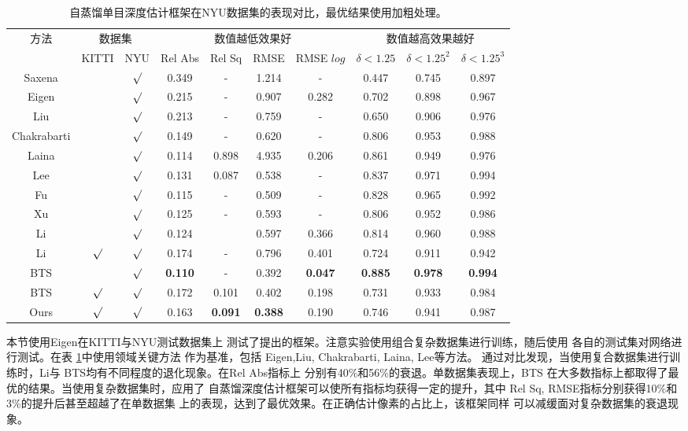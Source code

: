 \begin{table}[htb]
  \centering
  \caption{自蒸馏单目深度估计框架在NYU数据集的表现对比，最优结果使用加粗处理。}
  \label{tab:nyu quantitative result}
  \begin{tabular}{c|cc|cccc|ccc}
    \toprule
    \multirow{2}{*}{方法} & \multicolumn{2}{c|}{数据集}& \multicolumn{4}{c}{数值越低效果好}&\multicolumn{3}{|c}{数值越高效果越好}\\
    &KITTI&NYU& Rel Abs & Rel Sq & RMSE& RMSE $log$ &$\delta<1.25$ &$\delta<1.25^2$ & $\delta<1.25^3$ \\   
    \midrule
    Saxena\cite{Make3D}&&$\surd $&0.349&-&
    1.214&-&0.447&0.745&0.897\\
    Eigen\cite{eigen2014depth}&&$\surd$&0.215&-
    &0.907&0.282&0.702&0.898&0.967\\
    Liu\cite{liu2015learning}&&$\surd$&0.213&-&0.759&-&0.650&0.906&0.976\\
    Chakrabarti\cite{chakrabarti2016depth}&&$\surd$&0.149&-&0.620&-&0.806&0.953&0.988\\
    Laina\cite{laina2016deeper}&&$\surd$&0.114&0.898&4.935&0.206&0.861&0.949&0.976\\
    Lee\cite{lee2019monocular}&&$\surd$&
    0.131&0.087&0.538&-&0.837&0.971&0.994\\
    Fu\cite{FuCVPR18-DORN}&&$\surd$&0.115&-&0.509&-&0.828&0.965&0.992\\
    Xu\cite{xu2018structured}&&$\surd$&0.125&-&0.593&-&0.806&0.952&0.986\\
    \hline
    Li\cite{DABC}&&$\surd$&0.124&&0.597&0.366&0.814&0.960&0.988\\
    Li\cite{DABC}&$\surd$&$\surd$&0.174&-&0.796&0.401&0.724&0.911&0.942\\
    \hline
    BTS\cite{bts}&&$\surd$&\textbf{0.110}&-&0.392&\textbf{0.047}&\textbf{0.885}&\textbf{0.978}&\textbf{0.994}\\
    BTS\cite{bts}&$\surd$&$\surd$&0.172&0.101&0.402&0.198&0.731&0.933&0.984\\
    Ours&$\surd$&$\surd$&0.163&\textbf{0.091}&\textbf{0.388}&0.190&0.746&0.941&0.987\\
    \bottomrule
  \end{tabular}
\end{table}
本节使用Eigen\cite{eigen2014depth}在KITTI与NYU测试数据集上
测试了提出的框架。注意实验使用组合复杂数据集进行训练，随后使用
各自的测试集对网络进行测试。在表
\ref{tab:nyu quantitative result}中使用领域关键方法
作为基准，包括
Eigen\cite{eigen2014depth},Liu\cite{liu2015learning}, 
Chakrabarti\cite{chakrabarti2016depth}, 
Laina\cite{laina2016deeper}, Lee\cite{lee2019monocular}等方法。
通过对比发现，当使用复合数据集进行训练时，Li\cite{DABC}与
BTS\cite{bts}均有不同程度的退化现象。在Rel Abs指标上
分别有40\%和56\%的衰退。单数据集表现上，BTS\cite{bts}
在大多数指标上都取得了最优的结果。当使用复杂数据集时，应用了
自蒸馏深度估计框架可以使所有指标均获得一定的提升，其中
Rel Sq, RMSE指标分别获得10\%和3\%的提升后甚至超越了在单数据集
上的表现，达到了最优效果。在正确估计像素的占比上，该框架同样
可以减缓面对复杂数据集的衰退现象。


